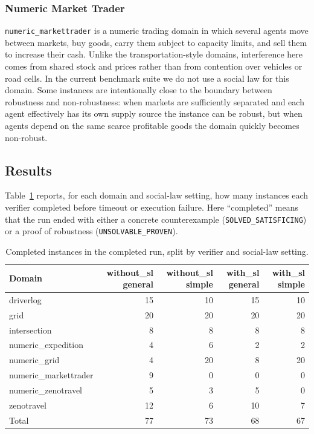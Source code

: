 \documentclass{article}
\theoremstyle{definition}
\begin{document}
\subsubsection{Numeric Market Trader}

\texttt{numeric\_markettrader} is a numeric trading domain in which several agents move between markets, buy goods, carry them subject to capacity limits, and sell them to increase their cash. Unlike the transportation-style domains, interference here comes from shared stock and prices rather than from contention over vehicles or road cells. In the current benchmark suite we do not use a social law for this domain. Some instances are intentionally close to the boundary between robustness and non-robustness: when markets are sufficiently separated and each agent effectively has its own supply source the instance can be robust, but when agents depend on the same scarce profitable goods the domain quickly becomes non-robust.

\subsection{Results}

Table~\ref{tab:results} reports, for each domain and social-law setting, how many instances each verifier completed before timeout or execution failure. Here ``completed'' means that the run ended with either a concrete counterexample (\texttt{SOLVED\_SATISFICING}) or a proof of robustness (\texttt{UNSOLVABLE\_PROVEN}).

\begin{table}[t]
\centering
\caption{Completed instances in the completed run, split by verifier and social-law setting.}
\label{tab:results}
\small
\begin{tabular}{@{}lrrrr@{}}
\toprule
Domain & without\_sl general & without\_sl simple & with\_sl general & with\_sl simple \\
\midrule
driverlog & 15 & 10 & 15 & 10 \\
grid & 20 & 20 & 20 & 20 \\
intersection & 8 & 8 & 8 & 8 \\
numeric\_expedition & 4 & 6 & 2 & 2 \\
numeric\_grid & 4 & 20 & 8 & 20 \\
numeric\_markettrader & 9 & 0 & 0 & 0 \\
numeric\_zenotravel & 5 & 3 & 5 & 0 \\
zenotravel & 12 & 6 & 10 & 7 \\
\midrule
Total & 77 & 73 & 68 & 67 \\
\bottomrule
\end{tabular}
\end{table}
\end{document}
